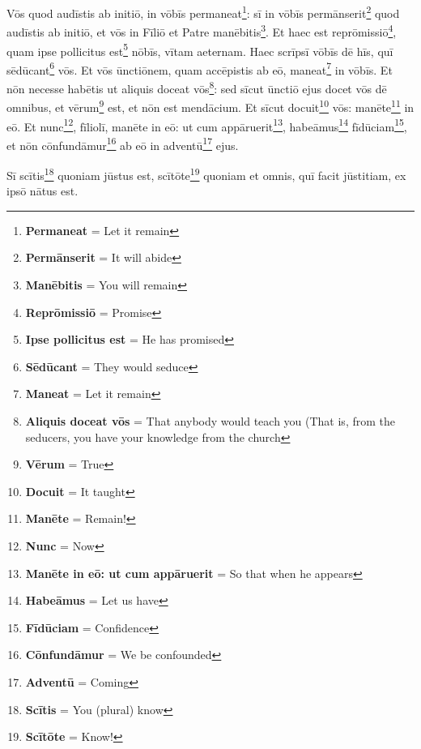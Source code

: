 Vōs quod audīstis ab initiō, in vōbīs permaneat\footnote{\textbf{Permaneat} = Let it remain}: sī in vōbīs permānserit\footnote{\textbf{Permānserit} = It will abide} quod audīstis ab initiō, et vōs in Fīliō et Patre manēbitis\footnote{\textbf{Manēbitis} = You will remain}. Et haec est reprōmissiō\footnote{\textbf{Reprōmissiō} = Promise}, quam ipse pollicitus est\footnote{\textbf{Ipse pollicitus est} = He has promised} nōbīs, vītam aeternam. Haec scrīpsī vōbīs dē hīs, quī sēdūcant\footnote{\textbf{Sēdūcant} = They would seduce} vōs. Et vōs ūnctiōnem, quam accēpistis ab eō, maneat\footnote{\textbf{Maneat} = Let it remain} in vōbīs. Et nōn necesse habētis ut aliquis doceat vōs\footnote{\textbf{Aliquis doceat vōs} = That anybody would teach you (That is, from the seducers, you have your knowledge from the church}: sed sīcut ūnctiō ejus docet vōs dē omnibus, et vērum\footnote{\textbf{Vērum} = True} est, et nōn est mendācium. Et sīcut docuit\footnote{\textbf{Docuit} = It taught} vōs: manēte\footnote{\textbf{Manēte} = Remain!} in eō.
 Et nunc\footnote{\textbf{Nunc} = Now}, fīliolī, manēte in eō: ut cum appāruerit\footnote{\textbf{Manēte in eō: ut cum appāruerit} = So that when he appears}, habeāmus\footnote{\textbf{Habeāmus} = Let us have} fīdūciam\footnote{\textbf{Fīdūciam} = Confidence}, et nōn cōnfundāmur\footnote{\textbf{Cōnfundāmur} = We be confounded} ab eō in adventū\footnote{\textbf{Adventū} = Coming} ejus.

 Sī scītis\footnote{\textbf{Scītis} = You (plural) know} quoniam jūstus est, scītōte\footnote{\textbf{Scītōte} = Know!} quoniam et omnis, quī facit jūstitiam, ex ipsō nātus est.


